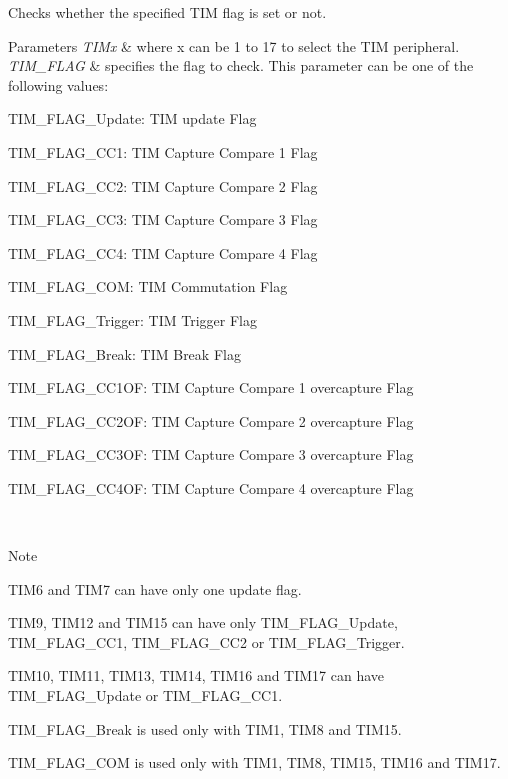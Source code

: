 Checks whether the specified T\+IM flag is set or not. 


\begin{DoxyParams}{Parameters}
{\em T\+I\+Mx} & where x can be 1 to 17 to select the T\+IM peripheral. \\
\hline
{\em T\+I\+M\+\_\+\+F\+L\+AG} & specifies the flag to check. This parameter can be one of the following values\+: \begin{DoxyItemize}
\item T\+I\+M\+\_\+\+F\+L\+A\+G\+\_\+\+Update\+: T\+IM update Flag \item T\+I\+M\+\_\+\+F\+L\+A\+G\+\_\+\+C\+C1\+: T\+IM Capture Compare 1 Flag \item T\+I\+M\+\_\+\+F\+L\+A\+G\+\_\+\+C\+C2\+: T\+IM Capture Compare 2 Flag \item T\+I\+M\+\_\+\+F\+L\+A\+G\+\_\+\+C\+C3\+: T\+IM Capture Compare 3 Flag \item T\+I\+M\+\_\+\+F\+L\+A\+G\+\_\+\+C\+C4\+: T\+IM Capture Compare 4 Flag \item T\+I\+M\+\_\+\+F\+L\+A\+G\+\_\+\+C\+OM\+: T\+IM Commutation Flag \item T\+I\+M\+\_\+\+F\+L\+A\+G\+\_\+\+Trigger\+: T\+IM Trigger Flag \item T\+I\+M\+\_\+\+F\+L\+A\+G\+\_\+\+Break\+: T\+IM Break Flag \item T\+I\+M\+\_\+\+F\+L\+A\+G\+\_\+\+C\+C1\+OF\+: T\+IM Capture Compare 1 overcapture Flag \item T\+I\+M\+\_\+\+F\+L\+A\+G\+\_\+\+C\+C2\+OF\+: T\+IM Capture Compare 2 overcapture Flag \item T\+I\+M\+\_\+\+F\+L\+A\+G\+\_\+\+C\+C3\+OF\+: T\+IM Capture Compare 3 overcapture Flag \item T\+I\+M\+\_\+\+F\+L\+A\+G\+\_\+\+C\+C4\+OF\+: T\+IM Capture Compare 4 overcapture Flag \end{DoxyItemize}
\\
\hline
\end{DoxyParams}
\begin{DoxyNote}{Note}

\begin{DoxyItemize}
\item T\+I\+M6 and T\+I\+M7 can have only one update flag.
\item T\+I\+M9, T\+I\+M12 and T\+I\+M15 can have only T\+I\+M\+\_\+\+F\+L\+A\+G\+\_\+\+Update, T\+I\+M\+\_\+\+F\+L\+A\+G\+\_\+\+C\+C1, T\+I\+M\+\_\+\+F\+L\+A\+G\+\_\+\+C\+C2 or T\+I\+M\+\_\+\+F\+L\+A\+G\+\_\+\+Trigger.
\item T\+I\+M10, T\+I\+M11, T\+I\+M13, T\+I\+M14, T\+I\+M16 and T\+I\+M17 can have T\+I\+M\+\_\+\+F\+L\+A\+G\+\_\+\+Update or T\+I\+M\+\_\+\+F\+L\+A\+G\+\_\+\+C\+C1.
\item T\+I\+M\+\_\+\+F\+L\+A\+G\+\_\+\+Break is used only with T\+I\+M1, T\+I\+M8 and T\+I\+M15.
\item T\+I\+M\+\_\+\+F\+L\+A\+G\+\_\+\+C\+OM is used only with T\+I\+M1, T\+I\+M8, T\+I\+M15, T\+I\+M16 and T\+I\+M17.
\end{DoxyItemize}
\end{DoxyNote}

